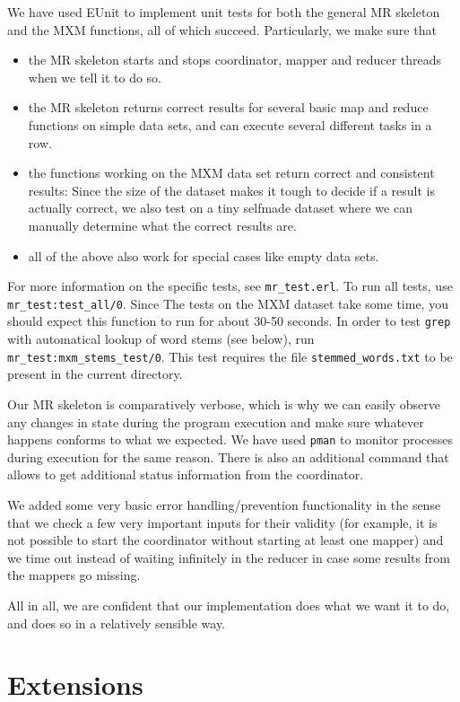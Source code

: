 \documentclass[a4paper]{article}
\begin{document}
We have used EUnit to implement unit tests for both the general MR skeleton and the MXM functions, all of which succeed. Particularly, we make sure that
\begin{itemize}
  \item the MR skeleton starts and stops coordinator, mapper and reducer threads when we tell it to do so.
  \item the MR skeleton returns correct results for several basic map and reduce functions on simple data sets, and can execute several different tasks in a row.
  \item the functions working on the MXM data set return correct and consistent results: Since the size of the dataset makes it tough to decide if a result is actually correct, we also test on a tiny selfmade dataset where we can manually determine what the correct results are.
  \item all of the above also work for special cases like empty data sets.
\end{itemize}
For more information on the specific tests, see \texttt{mr\_test.erl}. To run all tests, use \texttt{mr\_test:test\_all/0}. Since The tests on the MXM dataset take some time, you should expect this function to run for about 30-50 seconds. In order to test \texttt{grep} with automatical lookup of word stems (see below), run \texttt{mr\_test:mxm\_stems\_test/0}. This test requires the file \texttt{stemmed\_words.txt} to be present in the current directory.

Our MR skeleton is comparatively verbose, which is why we can easily observe any changes in state during the program execution and make sure whatever happens conforms to what we expected. We have used \texttt{pman} to monitor processes during execution for the same reason. There is also an additional command that allows to get additional status information from the coordinator.

We added some very basic error handling/prevention functionality in the sense that we check a few very important inputs for their validity (for example, it is not possible to start the coordinator without starting at least one mapper) and we time out instead of waiting infinitely in the reducer in case some results from the mappers go missing.

All in all, we are confident that our implementation does what we want it to do, and does so in a relatively sensible way.

\section*{Extensions}
\end{document}
